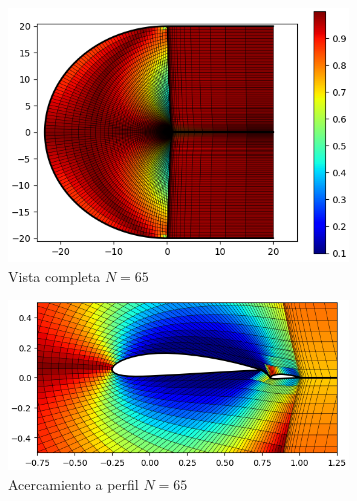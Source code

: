 \documentclass[letterpaper, openright, 12pt]{book}
\begin{document}
    \begin{figure}[htbp!]
        \centering
        \begin{subfigure}[c]{0.48\textwidth}
            \includegraphics[keepaspectratio, width=0.99\textwidth]
                {./img/naca4415_c_flap_n_65_skew_far}
            \caption{Vista completa $N = 65$}
            \label{fig:naca4415_c_flap_n_65_skew_far}
        \end{subfigure}
        \hfill
        \begin{subfigure}[c]{0.48\textwidth}
            \includegraphics[keepaspectratio, width=0.99\textwidth]
                {./img/naca4415_c_flap_n_65_skew_close}
            \caption{Acercamiento a perfil $N = 65$}
            \label{fig:naca4415_c_flap_n_65_skew_close}
        \end{subfigure}
        \begin{subfigure}[c]{0.48\textwidth}

\end{subfigure}
\end{figure}
\end{document}
